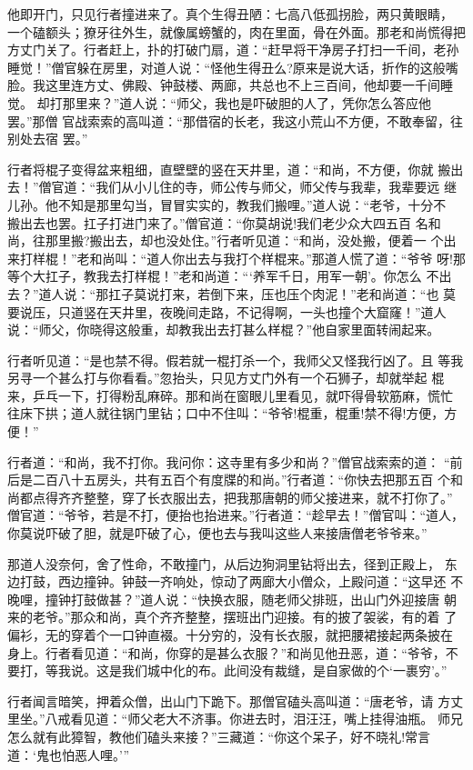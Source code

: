 他即开门，只见行者撞进来了。真个生得丑陋：七高八低孤拐脸，两只黄眼睛，
一个磕额头；獠牙往外生，就像属螃蟹的，肉在里面，骨在外面。那老和尚慌得把
方丈门关了。行者赶上，扑的打破门扇，道：“赶早将干净房子打扫一千间，老孙
睡觉！”僧官躲在房里，对道人说：“怪他生得丑么?原来是说大话，折作的这般嘴
脸。我这里连方丈、佛殿、钟鼓楼、两廊，共总也不上三百间，他却要一千间睡觉。
却打那里来？”道人说：“师父，我也是吓破胆的人了，凭你怎么答应他罢。”那僧
官战索索的高叫道：“那借宿的长老，我这小荒山不方便，不敢奉留，往别处去宿
罢。”

行者将棍子变得盆来粗细，直壁壁的竖在天井里，道：“和尚，不方便，你就
搬出去！”僧官道：“我们从小儿住的寺，师公传与师父，师父传与我辈，我辈要远
继儿孙。他不知是那里勾当，冒冒实实的，教我们搬哩。”道人说：“老爷，十分不
，搬出去也罢。扛子打进门来了。”僧官道：“你莫胡说!我们老少众大四五百
名和尚，往那里搬?搬出去，却也没处住。”行者听见道：“和尚，没处搬，便着一
个出来打样棍！”老和尚叫：“道人你出去与我打个样棍来。”那道人慌了道：“爷爷
呀!那等个大扛子，教我去打样棍！”老和尚道：“‘养军千日，用军一朝’。你怎么
不出去？”道人说：“那扛子莫说打来，若倒下来，压也压个肉泥！”老和尚道：“也
莫要说压，只道竖在天井里，夜晚间走路，不记得啊，一头也撞个大窟窿！”道人
说：“师父，你晓得这般重，却教我出去打甚么样棍？”他自家里面转闹起来。

行者听见道：“是也禁不得。假若就一棍打杀一个，我师父又怪我行凶了。且
等我另寻一个甚么打与你看看。”忽抬头，只见方丈门外有一个石狮子，却就举起
棍来，乒乓一下，打得粉乱麻碎。那和尚在窗眼儿里看见，就吓得骨软筋麻，慌忙
往床下拱；道人就往锅门里钻；口中不住叫：“爷爷!棍重，棍重!禁不得!方便，方
便！”

行者道：“和尚，我不打你。我问你：这寺里有多少和尚？”僧官战索索的道：
“前后是二百八十五房头，共有五百个有度牒的和尚。”行者道：“你快去把那五百
个和尚都点得齐齐整整，穿了长衣服出去，把我那唐朝的师父接进来，就不打你了。”
僧官道：“爷爷，若是不打，便抬也抬进来。”行者道：“趁早去！”僧官叫：“道人，
你莫说吓破了胆，就是吓破了心，便也去与我叫这些人来接唐僧老爷爷来。”

那道人没奈何，舍了性命，不敢撞门，从后边狗洞里钻将出去，径到正殿上，
东边打鼓，西边撞钟。钟鼓一齐响处，惊动了两廊大小僧众，上殿问道：“这早还
不晚哩，撞钟打鼓做甚？”道人说：“快换衣服，随老师父排班，出山门外迎接唐
朝来的老爷。”那众和尚，真个齐齐整整，摆班出门迎接。有的披了袈裟，有的着
了偏衫，无的穿着个一口钟直裰。十分穷的，没有长衣服，就把腰裙接起两条披在
身上。行者看见道：“和尚，你穿的是甚么衣服？”和尚见他丑恶，道：“爷爷，不
要打，等我说。这是我们城中化的布。此间没有裁缝，是自家做的个‘一裹穷’。”

行者闻言暗笑，押着众僧，出山门下跪下。那僧官磕头高叫道：“唐老爷，请
方丈里坐。”八戒看见道：“师父老大不济事。你进去时，泪汪汪，嘴上挂得油瓶。
师兄怎么就有此獐智，教他们磕头来接？”三藏道：“你这个呆子，好不晓礼!常言
道：‘鬼也怕恶人哩。’”

